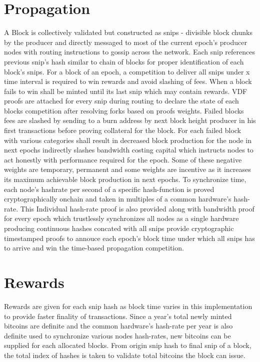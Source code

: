 \documentclass[a4paper,10pt]{article}
\begin{document}
\section{Propagation}
A Block is collectively validated but constructed as snips - divisible block chunks by the producer and directly messaged to most of the current epoch's producer nodes with routing instructions to gossip across the network. Each snip references previous snip's hash similar to chain of blocks for proper identification of each block's snips. For a block of an epoch, a competition to deliver all snips under x time interval is required to win rewards and avoid slashing of fees. When a block fails to win shall be minted until its last snip which may contain rewards. VDF proofs are attached for every snip during routing to declare the state of each blocks competition after resolving forks based on proofs weights. Failed blocks fees are slashed by sending to a burn address by next block height producer in his first transactions before proving collateral for the block. For each failed block with various categories shall result in decreased block production for the node in next epochs indirectly slashes bandwidth costing capital which instructs nodes to act honestly with performance required for the epoch. Some of these negative weights are temporary, permanent and some weights are incentive as it increases its maximum achievable block production in next epochs. To synchronize time, each node's hashrate per second of a specific hash-function is proved cryptographically onchain and taken in multiples of a common hardware's hash-rate. This Individual hash-rate proof is also provided along with bandwidth proof for every epoch which trustlessly synchronizes all nodes as a single hardware producing continuous hashes concated with all snips provide cryptographic timestamped proofs to annouce each epoch's block time under which all snips has to arrive and win the time-based propagation competition.
\section{Rewards}
Rewards are given for each snip hash as block time varies in this implementation to provide faster finality of transactions. Since a year's total newly minted bitcoins are definite and the common hardware's hash-rate per year is also definite used to synchronize various nodes hash-rates, new bitcoins can be supplied for each allocated blocks. From origin snip hash to final snip of a block, the total index of hashes is taken to validate total bitcoins the block can issue.
\end{document}
